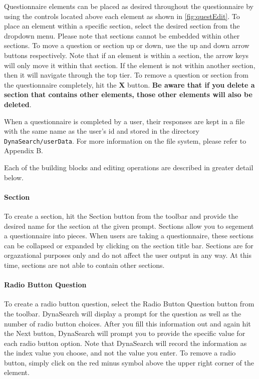 \documentclass[article]{ij4uq}              %
\begin{document}
Questionnaire elements can be placed as desired throughout the questionnaire by using the controls located above each element as shown in \ref{fig:questEdit}.  To place an element within a specific section, select the desired section from the dropdown menu.  Please note that sections cannot be embedded within other sections.  To move a question or section up or down, use the up and down arrow buttons respectively.  Note that if an element is within a section, the arrow keys will only move it within that section. If the element is not within another section, then it will navigate through the top tier.  To remove a question or section from the questionnaire completely, hit the \textbf{X} button.  \textbf{Be aware that if you delete a section that contains other elements, those other elements will also be deleted}.

When a questionnaire is completed by a user, their responses are kept in a file with the same name as the user's id and stored in the directory \texttt{DynaSearch/userData}. For more information on the file system, please refer to Appendix B.

 Each of the building blocks and editing operations are described in greater detail below.


\paragraph{Section}
To create a section, hit the Section button from the toolbar and provide the desired name for the section at the given prompt.  Sections allow you to segement a questionnaire into pieces.  When users are taking a questionnaire, these sections can be collapsed or expanded by clicking on the section title bar.  Sections are for orgazational purposes only and do not affect the user output in any way.  At this time, sections are not able to contain other sections.


\paragraph{Radio Button Question}
To create a radio button question, select the Radio Button Question button from the toolbar. DynaSearch will display a prompt for the question as well as the number of radio button choices. After you fill this information out and again hit the Next button, DynaSearch will prompt you to provide the specific value for each radio button option. 
Note that DynaSearch will record the information as the index value you choose, and not the value you enter. To remove a radio button, simply click on the red minus symbol above the upper right corner of the element.
\end{document}
